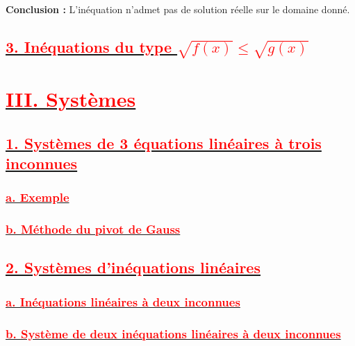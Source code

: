 \documentclass[12pt]{article}
\newcounter{solution}
\begin{document}
\textbf{Conclusion :} L'inéquation n'admet pas de solution réelle sur le domaine donné.

\subsection*{\underline{\textbf{\textcolor{red}{3. Inéquations du type \( \sqrt{f(x)} \leq  \sqrt{g(x)} \) }}}}

\section*{\underline{\textbf{\textcolor{red}{III. Systèmes}}}}
\subsection*{\underline{\textbf{\textcolor{red}{1. Systèmes de 3 équations linéaires à trois inconnues}}}}
\subsubsection*{\underline{\textbf{\textcolor{red}{a. Exemple}}}}
\subsubsection*{\underline{\textbf{\textcolor{red}{b. Méthode du pivot de Gauss }}}}
\subsection*{\underline{\textbf{\textcolor{red}{2. Systèmes d’inéquations linéaires }}}}
\subsubsection*{\underline{\textbf{\textcolor{red}{a. Inéquations linéaires à deux inconnues}}}}
\subsubsection*{\underline{\textbf{\textcolor{red}{b. Système de deux inéquations linéaires à deux inconnues }}}}
\end{document}
